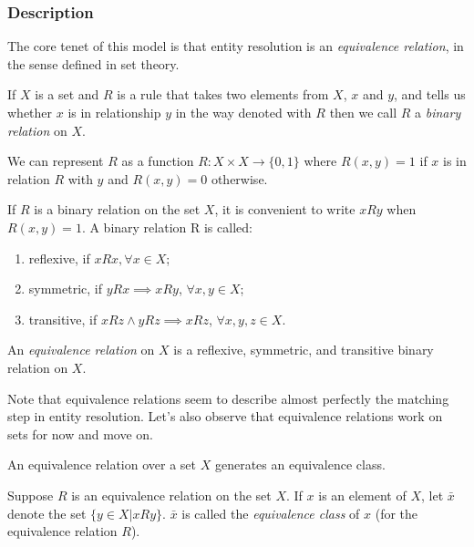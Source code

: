 \documentclass[11pt]{article}
\begin{document}
    \subsubsection[algdesc]{Description}\label{subsubsec:algdesc}

    The core tenet of this model is that entity resolution is an \textit{
    equivalence relation}, in the sense defined in set theory.
    
    \begin{defn} If $X$ is a set and $R$ is a rule that takes two elements from
    $X$, $x$ and $y$, and tells us whether $x$ is in relationship $y$ in the way
    denoted with $R$ then we call $R$ a \textit{binary relation} on
    $X$\cite{hoffman1971linear}.
    \end{defn}

    We can represent $R$ as a function $R:X \times X \rightarrow \{0,1\}$ where
    $R(x,y)=1$ if $x$ is in relation $R$ with $y$ and $R(x,y)=0$ otherwise.
    
    \begin{defn}If $R$ is a binary relation on the set $X$, it is convenient to
    write $xRy$ when $R(x, y) = 1$. A binary relation R is called:

    \begin{enumerate}
        \item reflexive, if $xRx, \forall x \in X$;
        \item symmetric, if $yRx \implies xRy$, $\forall x,y \in X$;
        \item transitive, if $xRz \land yRz \implies xRz$, $\forall x,y,z \in X$.
    \end{enumerate}

    An \textit{equivalence relation} on $X$ is a reflexive, symmetric, and
    transitive binary relation on $X$\cite{hoffman1971linear}.
    \end{defn}

    Note that equivalence relations seem to describe almost perfectly the
    matching step in entity resolution.
    Let's also observe that equivalence relations work on sets for now and move
    on.

    An equivalence relation over a set $X$ generates an equivalence class.

    \begin{defn}Suppose $R$ is an equivalence relation on the set $X$. If $x$ is
    an element of $X$, let $\bar{x}$ denote the set $\{y \in X | xRy\}$.
    $\bar{x}$ is called the \textit{equivalence class} of $x$ (for the
    equivalence relation $R$)\cite{hoffman1971linear}.
    \end{defn}
\end{document}
